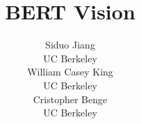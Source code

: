 \documentclass[11pt,a4paper]{article}
\title{BERT Vision}
\author{Siduo Jiang \\
  UC Berkeley \\
  \And
  William Casey King \\
  UC Berkeley \\
  \And
  Cristopher Benge \\
  UC Berkeley}
\date{}
\begin{document}
	\maketitle
	
	
	
	
	
	
	


	

	\nocite{*}
	
	

	
	
\end{document}
